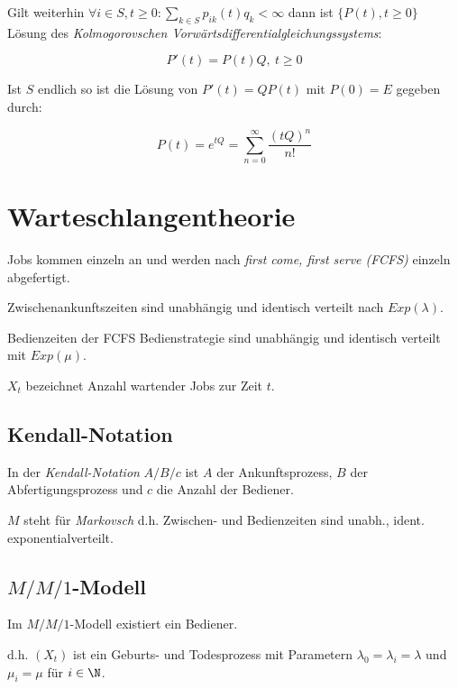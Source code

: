 \spacing

Gilt weiterhin $\forall i \in S, t \geq 0 : \sum_{k \in S} p_{ik}(t)q_k < \infty$ dann ist $\{P(t),t\geq 0\}$ Lösung des \emph{Kolmogorovschen Vorwärtsdifferentialgleichungssystems}:

\vspace*{-2mm}
$$P'(t)=P(t)Q, \ t \geq 0$$

\spacing

Ist $S$ endlich so ist die Lösung von $P'(t) = QP(t)$ mit $P(0)=E$ gegeben durch:

\vspace*{-2mm}
$$P(t) = e^{tQ} = \sum_{n=0}^\infty \frac{(tQ)^n}{n!}$$

\section*{Warteschlangentheorie}

Jobs kommen einzeln an und werden nach \emph{first come, first serve (FCFS)} einzeln abgefertigt.

Zwischenankunftszeiten sind unabhängig und identisch verteilt nach $Exp(\lambda)$.

Bedienzeiten der FCFS Bedienstrategie sind unabhängig und identisch verteilt mit $Exp(\mu)$.

$X_t$ bezeichnet Anzahl wartender Jobs zur Zeit $t$.

\subsection*{Kendall-Notation}

In der \emph{Kendall-Notation} $A/B/c$ ist $A$ der Ankunftsprozess, $B$ der Abfertigungsprozess und $c$ die Anzahl der Bediener.

\vspace*{1mm}

$M$ steht für \emph{Markovsch} d.h. Zwischen- und Bedienzeiten sind unabh., ident. exponentialverteilt.

\subsection*{$M/M/1$-Modell}

Im $M/M/1$-Modell existiert ein Bediener.

d.h. $(X_t)$ ist ein Geburts- und Todesprozess mit Parametern $\lambda_0 = \lambda_i = \lambda$ und $\mu_i = \mu$ für $i \in \N$.

\vspace*{1mm}

